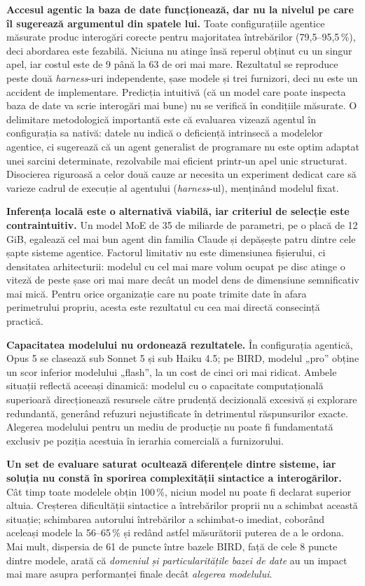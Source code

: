 \documentclass[12pt,a4paper]{report}
\begin{document}
\textbf{Accesul agentic la baza de date funcționează, dar nu la nivelul pe
care îl sugerează argumentul din spatele lui.} Toate configurațiile agentice
măsurate produc interogări corecte pentru majoritatea întrebărilor
(79,5--95,5\,\%), deci abordarea este fezabilă. Niciuna nu atinge însă
reperul obținut cu un singur apel, iar costul este de 9 până la 63 de ori mai
mare. Rezultatul se reproduce peste două \emph{harness}-uri independente,
șase modele și trei furnizori, deci nu este un accident de implementare.
Predicția intuitivă (că un model care poate inspecta baza de date va scrie
interogări mai bune) nu se verifică în condițiile măsurate. O delimitare metodologică importantă este că evaluarea vizează
agentul în configurația sa nativă: datele nu indică o deficiență intrinsecă a modelelor agentice,
ci sugerează că un agent generalist de programare nu este optim adaptat unei sarcini determinate,
rezolvabile mai eficient printr-un apel unic structurat. Disocierea riguroasă a celor două cauze ar necesita un
experiment dedicat care să varieze cadrul de execuție al agentului (\emph{harness}-ul), menținând modelul fixat.

\textbf{Inferența locală este o alternativă viabilă, iar criteriul de selecție
este contraintuitiv.} Un model MoE de 35 de miliarde de parametri, pe o placă
de 12 GiB, egalează cel mai bun agent din familia Claude și depășește
patru dintre cele șapte sisteme agentice. Factorul limitativ nu este
dimensiunea fișierului, ci densitatea arhitecturii: modelul cu cel mai mare volum ocupat pe disc atinge
o viteză de peste șase ori mai mare decât un model dens de dimensiune semnificativ mai mică. Pentru orice
organizație care nu poate trimite date în afara perimetrului propriu, acesta
este rezultatul cu cea mai directă consecință practică.

\textbf{Capacitatea modelului nu ordonează rezultatele.} În configurația agentică,
Opus 5 se clasează sub Sonnet 5 și sub Haiku 4.5; pe BIRD, modelul „pro”
obține un scor inferior modelului „flash”, la un cost de cinci ori mai ridicat. Ambele situații reflectă aceeași
dinamică: modelul cu o capacitate computațională superioară direcționează resursele către prudență decizională
excesivă și explorare redundantă, generând refuzuri nejustificate în detrimentul răspunsurilor exacte.
Alegerea modelului pentru un mediu de producție nu poate fi fundamentată exclusiv pe poziția acestuia în
ierarhia comercială a furnizorului.

\textbf{Un set de evaluare saturat ocultează diferențele dintre sisteme, iar
soluția nu constă în sporirea complexității sintactice a interogărilor.} Cât timp toate modelele obțin 100\,\%, niciun
model nu poate fi declarat superior altuia. Creșterea dificultății
sintactice a întrebărilor proprii nu a schimbat această situație; schimbarea
autorului întrebărilor a schimbat-o imediat, coborând aceleași modele la
56--65\,\% și redând astfel măsurătorii puterea de a le ordona. Mai mult, dispersia de 61 de puncte
între bazele BIRD, față de cele 8 puncte dintre modele, arată că
\emph{domeniul și particularitățile bazei de date} au un impact mai mare asupra performanței finale decât
\emph{alegerea modelului}.
\end{document}

